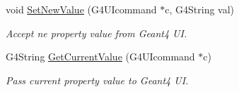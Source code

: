 \begin{DoxyCompactItemize}
void \hyperlink{class_d_d4hep_1_1_simulation_1_1_geant4_u_i_messenger_ad8599a95c5a70bc07dbb6c16e81f5894}{SetNewValue} (G4UIcommand $\ast$c, G4String val)
\begin{DoxyCompactList}\small\item\em Accept ne property value from Geant4 UI. \item\end{DoxyCompactList}\item 
G4String \hyperlink{class_d_d4hep_1_1_simulation_1_1_geant4_u_i_messenger_a931458312c22e41fd3a49ae0a8364293}{GetCurrentValue} (G4UIcommand $\ast$c)
\begin{DoxyCompactList}\small\item\em Pass current property value to Geant4 UI. \item\end{DoxyCompactList}\end{DoxyCompactItemize}
